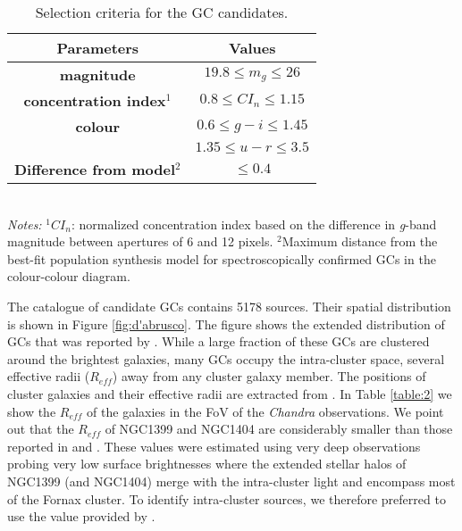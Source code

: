\documentclass{aa}
\begin{document}
\begin{table}
\caption{Selection criteria for the GC candidates.}   %
\label{table:1}      %
\centering                          %
\begin{tabular}{c c}        %
\hline\hline                 %
Parameters & Values \\    %
\hline                        %
   \textbf{magnitude} & \textbf{$19.8\leq m_g \leq 26$} \\      %
   \textbf{concentration index$^1$} & $0.8 \leq CI_n \leq 1.15$ \\
  \textbf{colour} &$0.6 \leq g-i \leq 1.45$ \\
 & $1.35 \leq u-r \leq 3.5$ \\
  \textbf{Difference from model$^2$} & $\leq 0.4$ \\
\hline                                   %
\end{tabular}
\vspace{1mm}
 \scriptsize{
 \\
 {\it Notes:} $^1$\textit{$CI_n$}: normalized concentration index based on the difference in \textit{g}-band magnitude between apertures of 6 and 12 pixels. 
  $^2$Maximum distance from the best-fit population synthesis model for spectroscopically confirmed GCs in the colour-colour diagram.}
\end{table}

The catalogue of candidate GCs contains 5178 sources. Their spatial distribution is shown in Figure \ref{fig:d'abrusco}.  The figure shows the extended distribution of GCs that was reported by \cite{D'Abrusco2016}. While a large fraction of these GCs are clustered around the brightest galaxies, many GCs occupy the intra-cluster space, several effective radii ($R_{eff}$) away from any cluster galaxy member. The positions of cluster galaxies and their effective radii are extracted from \cite{Ferguson1998}. In Table \ref{table:2} we show the $R_{eff}$ of the galaxies in the FoV of the \textit{Chandra} observations. We point out that the $R_{eff}$ of NGC1399 and NGC1404 are considerably smaller than those reported in \cite{Iodice2016} and \cite{Iodice2019}. These values were estimated using very deep observations probing very low surface brightnesses where the extended stellar halos of NGC1399 (and NGC1404) merge with the intra-cluster light and encompass most of the Fornax cluster. To identify intra-cluster sources, we therefore preferred to use the value provided by \cite{Ferguson1998}.
\end{document}
